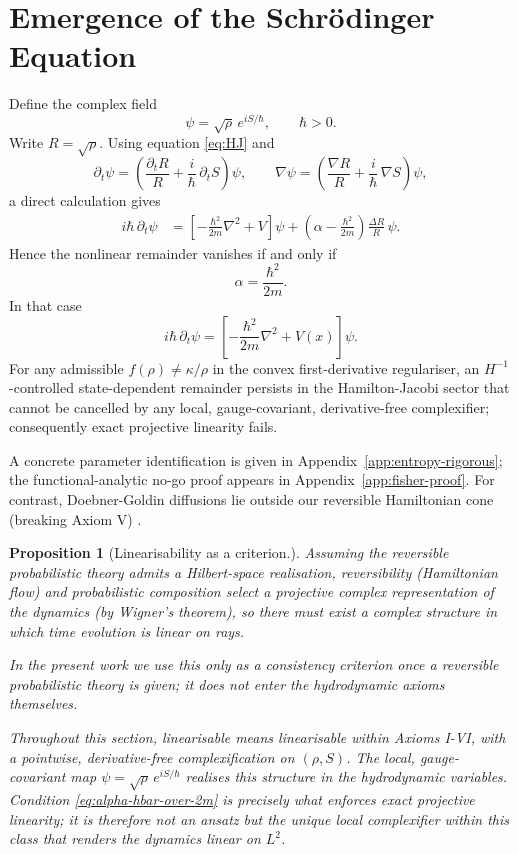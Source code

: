 \documentclass[11pt,a4paper]{article}
\numberwithin{equation}{section}
\theoremstyle{thmcompact}
\newtheorem{proposition}[theorem]{Proposition}
\theoremstyle{remark}
\begin{document}
\section{Emergence of the Schrödinger Equation}

Define the complex field
\begin{equation}
	\label{eq:map}
	\psi=\sqrt{\rho}\,e^{iS/\hbar},\qquad \hbar>0.
\end{equation}
Write $R=\sqrt{\rho}$. Using equation \ref{eq:HJ} and
\[
\partial_t\psi=\left(\frac{\partial_t R}{R}+\frac{i}{\hbar}\,\partial_t S\right)\psi,\qquad
\nabla\psi=\left(\frac{\nabla R}{R}+\frac{i}{\hbar}\,\nabla S\right)\psi,
\]
a direct calculation gives
\begin{align*}
	i\hbar\,\partial_t\psi
	&=\left[-\frac{\hbar^2}{2m}\nabla^2+V\right]\psi
	+\left(\alpha-\frac{\hbar^2}{2m}\right)\frac{\Delta R}{R}\,\psi.
\end{align*}
Hence the nonlinear remainder vanishes if and only if
\begin{equation}
	\alpha=\frac{\hbar^{2}}{2m}.
	\label{eq:alpha-hbar-over-2m}
\end{equation}
In that case
\begin{equation}
	i\hbar\,\partial_t\psi
	=\left[-\frac{\hbar^2}{2m}\nabla^2+V(x)\right]\psi.
	\label{eq:LSEderived}
\end{equation}
For any admissible \(f(\rho)\neq \kappa/\rho\) in the convex first-derivative regulariser, an \(H^{-1}\)-controlled state-dependent remainder persists in the Hamilton-Jacobi sector that cannot be cancelled by any local, gauge-covariant, derivative-free complexifier; consequently exact projective linearity fails.

A concrete parameter identification is given in Appendix~\ref{app:entropy-rigorous}; the functional-analytic no-go proof appears in Appendix~\ref{app:fisher-proof}. For contrast, Doebner-Goldin diffusions lie outside our reversible Hamiltonian cone (breaking Axiom V) \cite{doebner1992,doebner1996}.


\begin{proposition}[Linearisability as a criterion.]
	Assuming the reversible probabilistic theory admits a Hilbert-space realisation,
	reversibility (Hamiltonian flow) and probabilistic composition select a projective	complex representation of the dynamics (by Wigner's theorem), so there must exist	a complex structure in which time evolution is linear on rays.
	
	In the present work we use this only as a consistency criterion once a reversible probabilistic theory is given; it does not enter the hydrodynamic axioms themselves.	
	
	Throughout this	section, linearisable means linearisable \emph{within Axioms I-VI}, with a pointwise, derivative-free complexification on \((\rho,S)\). The local, gauge-covariant map \(\psi=\sqrt{\rho}\,e^{iS/\hbar}\) realises this structure	in the hydrodynamic variables. Condition \eqref{eq:alpha-hbar-over-2m} is
	precisely what enforces exact projective linearity; it is therefore not an ansatz but the unique local complexifier \emph{within this class} that renders
	the dynamics linear on \(L^{2}\).
\end{proposition}
\end{document}
